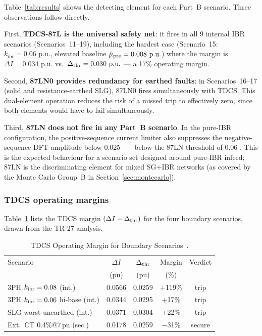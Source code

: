 \documentclass[journal,twoside,10pt]{IEEEtran}
\newcommand{\kibr}{k_{\mathrm{ibr}}}
\newcommand{\pu}{\,\text{p.u.}}
\begin{document}
Table~\ref{tab:results} shows the detecting element for each Part~B
scenario.  Three observations follow directly.

First, \textbf{TDCS-87L is the universal safety net}: it fires in all
9 internal IBR scenarios (Scenarios~11--19), including the hardest case
(Scenario~15: $\kibr = 0.06\,\pu$, elevated baseline $\hat{\mu}_{\rm pre}
= 0.008\,\pu$) where the margin is $\Delta I = 0.034\,\pu$ vs.\
$\Delta_{\rm thr} = 0.030\,\pu$ --- a 17\% operating margin.

Second, \textbf{87LN0 provides redundancy for earthed faults}: in
Scenarios~16--17 (solid and resistance-earthed SLG), 87LN0 fires
simultaneously with TDCS.  This dual-element operation reduces the
risk of a missed trip to effectively zero, since both elements would
have to fail simultaneously.

Third, \textbf{87LN does not fire in any Part~B scenario}.
In the pure-IBR configuration, the positive-sequence current limiter
also suppresses the negative-sequence DFT amplitude below 0.025\,\pu
--- below the 87LN threshold of 0.06\,\pu.  This is the expected
behaviour for a scenario set designed around pure-IBR infeed; 87LN
is the discriminating element for mixed SG+IBR networks (as covered
by the Monte Carlo Group~B in Section~\ref{sec:montecarlo}).

\subsubsection{TDCS operating margins}

Table~\ref{tab:tdcs_margin} lists the TDCS margin
$(\Delta I - \Delta_{\rm thr})$ for the four boundary scenarios,
drawn from the TR-27 analysis.

\begin{table}[!t]
\centering
\caption{TDCS Operating Margin for Boundary Scenarios~\cite{SAMBP_TR27}.}
\label{tab:tdcs_margin}
\setlength{\tabcolsep}{4pt}
\renewcommand{\arraystretch}{1.08}
\begin{tabular}{lcccc}
\toprule
Scenario & $\Delta I$ & $\Delta_{\rm thr}$ & Margin & Verdict \\
         & (pu) & (pu) & (\%) & \\
\midrule
3PH $k_{\rm ibr}=0.08$ (int.) & 0.0566 & 0.0259 & +119\% & trip \\
3PH $k_{\rm ibr}=0.06$ hi-base (int.) & 0.0344 & 0.0295 & +17\%  & trip \\
SLG worst unearthed (int.)    & 0.0371 & 0.0304 & +22\%  & trip \\
Ext.\ CT 0.4\%@7\,pu (sec.)  & 0.0178 & 0.0259 & $-$31\%& secure \\
\bottomrule
\end{tabular}
\end{table}
\end{document}
